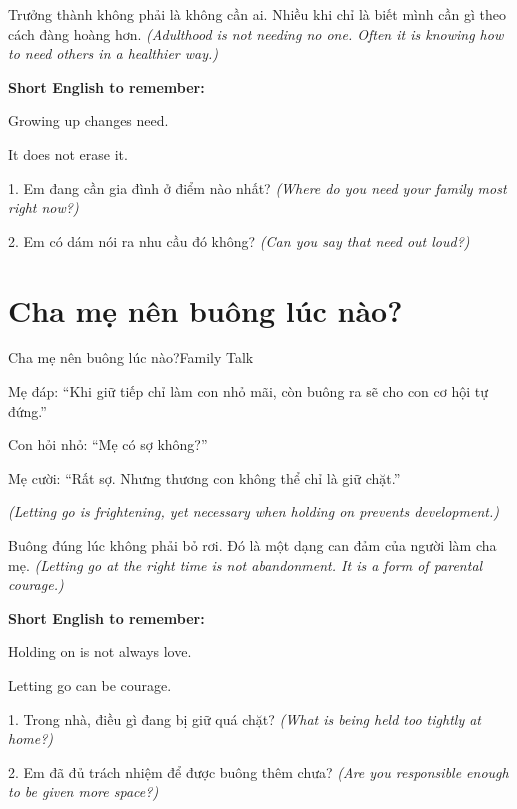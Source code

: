 \begin{baihoc}
Trưởng thành không phải là không cần ai. Nhiều khi chỉ là biết mình cần gì theo cách đàng hoàng hơn.
\textit{(Adulthood is not needing no one. Often it is knowing how to need others in a healthier way.)}
\end{baihoc}

\begin{ghinhoanh}
\textbf{Short English to remember:}

Growing up changes need.

It does not erase it.
\end{ghinhoanh}

\begin{tuhocnhanh}
1. Em đang cần gia đình ở điểm nào nhất? \textit{(Where do you need your family most right now?)}

2. Em có dám nói ra nhu cầu đó không? \textit{(Can you say that need out loud?)}
\end{tuhocnhanh}
\ngancach

\section{Cha mẹ nên buông lúc nào?}
\begin{truyen}{Cha mẹ nên buông lúc nào?}{Family Talk}

Mẹ đáp: ``Khi giữ tiếp chỉ làm con nhỏ mãi, còn buông ra sẽ cho con cơ hội tự đứng.''

Con hỏi nhỏ: ``Mẹ có sợ không?''

Mẹ cười: ``Rất sợ. Nhưng thương con không thể chỉ là giữ chặt.''

\textit{(Letting go is frightening, yet necessary when holding on prevents development.)}
\end{truyen}

\begin{baihoc}
Buông đúng lúc không phải bỏ rơi. Đó là một dạng can đảm của người làm cha mẹ.
\textit{(Letting go at the right time is not abandonment. It is a form of parental courage.)}
\end{baihoc}

\begin{ghinhoanh}
\textbf{Short English to remember:}

Holding on is not always love.

Letting go can be courage.
\end{ghinhoanh}

\begin{tuhocnhanh}
1. Trong nhà, điều gì đang bị giữ quá chặt? \textit{(What is being held too tightly at home?)}

2. Em đã đủ trách nhiệm để được buông thêm chưa? \textit{(Are you responsible enough to be given more space?)}
\end{tuhocnhanh}
\ngancach


